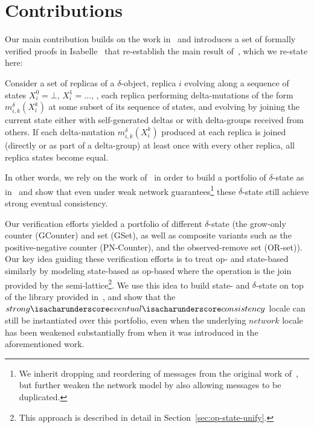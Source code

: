 \section{Contributions}

Our main contribution builds on the work in~\citep{gomes17} and introduces a set
of formally verified proofs in Isabelle~\citep{wenzel02} that re-establish the
main result of~\citep{almedia18}, which we re-state here:

\begin{theorem}
  Consider a set of replicas of a $\delta$-\CRDT object, replica $i$ evolving
  along a sequence of states $X_i^0 = \bot$, $X_i^1=\ldots$, , each replica
  performing delta-mutations of the form $m^\delta_{i,k}(X^k_i)$ at some subset
  of its sequence of states, and evolving by joining the current state either
  with self-generated deltas or with delta-groups received from others. If each
  delta-mutation $m^\delta _{i,k}(X^k_i)$ produced at each replica is joined
  (directly or as part of a delta-group) at least once with every other replica,
  all replica states become equal.
\end{theorem}

In other words, we rely on the work of~\citep{gomes17} in order to build a
portfolio of $\delta$-state \CRDTs as in~\citep{almedia18} and show that even
under weak network guarantees\footnote{We inherit dropping and reordering of
messages from the original work of~\citep{gomes17}, but further weaken the
network model by also allowing messages to be duplicated.} these $\delta$-state
\CRDTs still achieve strong eventual consistency.

Our verification efforts yielded a portfolio of different $\delta$-state \CRDTs
(the grow-only counter (GCounter) and set (GSet), as well as composite variants
such as the positive-negative counter (PN-Counter), and the observed-remove set
(OR-set)). Our key idea guiding these verification efforts is to treat op- and
state-based \CRDTs similarly by modeling state-based \CRDTs as op-based where the
operation is the join provided by the semi-lattice\footnote{This approach is
described in detail in Section~\ref{sec:op-state-unify}.}. We use this idea to
build state- and $\delta$-state \CRDTs on top of the library provided
in~\citep{gomes17}, and show that the
$strong{\isacharunderscore}eventual{\isacharunderscore}consistency$ locale can
still be instantiated over this portfolio, even when the underlying $network$
locale has been weakened substantially from when it was introduced in the
aforementioned work.

